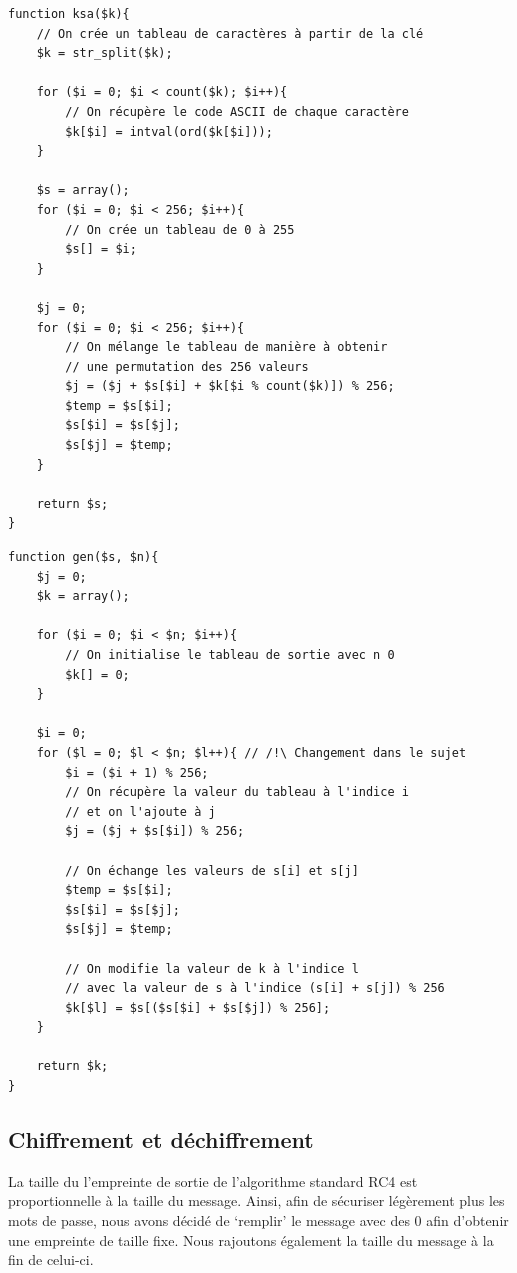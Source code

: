 \documentclass[12pt, a4paper]{article}
\begin{document}
\begin{lstlisting}[name=Fonction de génération de la permutation]
function ksa($k){
    // On crée un tableau de caractères à partir de la clé
    $k = str_split($k);
    
    for ($i = 0; $i < count($k); $i++){
        // On récupère le code ASCII de chaque caractère
        $k[$i] = intval(ord($k[$i]));
    }

    $s = array();
    for ($i = 0; $i < 256; $i++){
        // On crée un tableau de 0 à 255
        $s[] = $i;
    }

    $j = 0;
    for ($i = 0; $i < 256; $i++){
        // On mélange le tableau de manière à obtenir
        // une permutation des 256 valeurs
        $j = ($j + $s[$i] + $k[$i % count($k)]) % 256;
        $temp = $s[$i];
        $s[$i] = $s[$j];
        $s[$j] = $temp;
    }

    return $s;
}
\end{lstlisting}

\begin{lstlisting}[name=Fonction de génération de la suite chiffrante]
function gen($s, $n){
    $j = 0;
    $k = array();

    for ($i = 0; $i < $n; $i++){
        // On initialise le tableau de sortie avec n 0
        $k[] = 0;
    }
    
    $i = 0;
    for ($l = 0; $l < $n; $l++){ // /!\ Changement dans le sujet
        $i = ($i + 1) % 256;
        // On récupère la valeur du tableau à l'indice i
        // et on l'ajoute à j
        $j = ($j + $s[$i]) % 256;

        // On échange les valeurs de s[i] et s[j]
        $temp = $s[$i];
        $s[$i] = $s[$j];
        $s[$j] = $temp;

        // On modifie la valeur de k à l'indice l
        // avec la valeur de s à l'indice (s[i] + s[j]) % 256
        $k[$l] = $s[($s[$i] + $s[$j]) % 256];
    }

    return $k;
}
\end{lstlisting}

\subsection{Chiffrement et déchiffrement}

La taille du l'empreinte de sortie de l'algorithme standard RC4 est proportionnelle à la taille du message.
Ainsi, afin de sécuriser légèrement plus les mots de passe,
nous avons décidé de `remplir' le message avec des 0 afin d'obtenir une empreinte de taille fixe.
Nous rajoutons également la taille du message à la fin de celui-ci.
\end{document}
